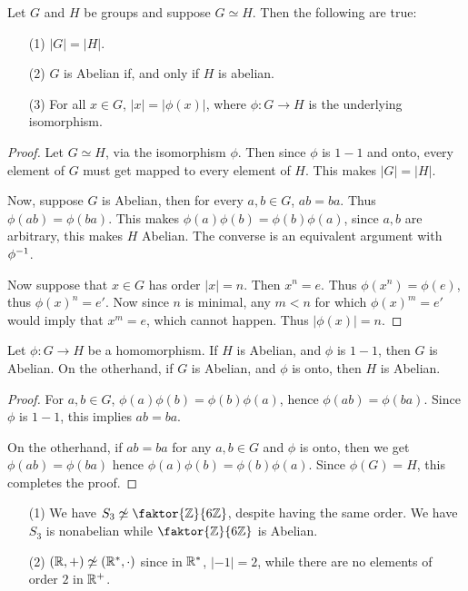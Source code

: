\begin{proposition}\label{proposition_1.5.3}
  Let $G$ and  $H$ be groups and suppose  $G \simeq H$. Then the following are
  true:
  \begin{enumerate}
    \item[(1)] $|G|=|H|$.

    \item[(2)] $G$ is Abelian if, and only if  $H$ is abelian.

    \item[(3)] For all $x \in G$, $|x|=|\phi(x)|$, where $\phi:G
      \xrightarrow{} H$ is the underlying isomorphism.
  \end{enumerate}
\end{proposition}
\begin{proof}
  Let $G \simeq H$,  via the isomorphism  $\phi$. Then since $\phi$ is  $1-1$
  and onto, every element of  $G$ must get mapped to every element of  $H$.
  This makes $|G|=|H|$.

  Now, suppose $G$ is Abelian, then for every  $a, b \in G$,  $ab=ba$. Thus
  $\phi(ab)=\phi(ba)$. This makes $\phi(a)\phi(b)=\phi(b)\phi(a)$, since $a,b$
  are arbitrary, this makes  $H$ Abelian. The converse is an equivalent
  argument with  $\phi^{-1}$.

  Now suppose that $x \in G$ has order  $|x|=n$. Then $x^n=e$. Thus
  $\phi(x^n)=\phi(e)$, thus $\phi(x)^n=e'$. Now since $n$ is minimal, any
  $m<n$ for which  $\phi(x)^m=e'$ would imply that $x^m=e$, which cannot
  happen. Thus  $|\phi(x)|=n$.
\end{proof}
\begin{corollary}
  Let $\phi:G \rightarrow H$ be a homomorphism. If $H$ is Abelian, and  $\phi$
  is  $1-1$, then  $G$ is Abelian. On the otherhand, if  $G$ is Abelian, and
  $\phi$ is onto, then  $H$ is Abelian.
\end{corollary}
\begin{proof}
  For $a,b \in G$,  $\phi(a)\phi(b)=\phi(b)\phi(a)$, hence
  $\phi(ab)=\phi(ba)$. Since $\phi$ is  $1-1$, this implies  $ab=ba$.

  On the otherhand, if $ab=ba$ for any  $a,b \in G$ and  $\phi$ is onto, then
  we get  $\phi(ab)=\phi(ba)$ hence $\phi(a)\phi(b)=\phi(b)\phi(a)$. Since
  $\phi(G)=H$, this completes the proof.
\end{proof}

\begin{example}\label{example_1.13}
  \begin{enumerate}
    \item[(1)] We have $S_3 \not\simeq \faktor{\Z}{6\Z}$, despite having the
      same order. We have $S_3$ is nonabelian while  $\faktor{\Z}{6\Z}$ is
      Abelian.

    \item[(2)] $(\mathbb{R},+) \not\simeq (\mathbb{R}^*, \cdot)$ since in $\mathbb{R}^*$,
      $|-1|=2$, while there are no elements of order $2$ in  $\mathbb{R}^+$.
  \end{enumerate}
\end{example}

